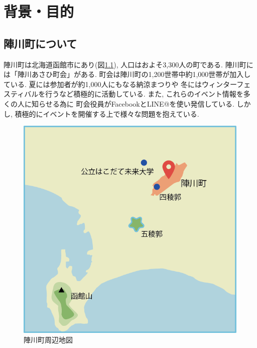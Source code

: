 \chapter{背景・目的}

\section{陣川町について}
陣川町は北海道函館市にあり(図\ref{map}), 人口はおよそ3,300人の町である.
陣川町には「陣川あさひ町会」がある.
町会は陣川町の1,200世帯中約1,000世帯が加入している.
夏には参加者が約1,000人にもなる納涼まつりや
冬にはウィンターフェスティバルを行うなど積極的に活動している.
また, これらのイベント情報を多くの人に知らせる為に
町会役員がFacebookとLINE@を使い発信している.
しかし, 積極的にイベントを開催する上で様々な問題を抱えている. 
\\
\begin{figure}[h]
    \begin{center}
        \includegraphics[keepaspectratio, scale=0.7]{map.png}
        \caption{陣川町周辺地図}
        \label{map}
    \end{center}
\end{figure}


